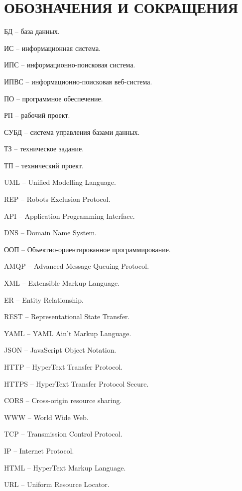 \section*{ОБОЗНАЧЕНИЯ И СОКРАЩЕНИЯ}

БД -- база данных.

ИС -- информационная система.

ИПС -- информационно-поисковая система.

ИПВС -- информационно-поисковая веб-система.

ПО -- программное обеспечение.

РП -- рабочий проект.

СУБД -- система управления базами данных.

ТЗ -- техническое задание.

ТП -- технический проект.

UML -- Unified Modelling Language.

REP -- Robots Exclusion Protocol.

API -- Application Programming Interface.

DNS -- Domain Name System.

ООП -- Объектно-ориентированное программирование.

AMQP -- Advanced Message Queuing Protocol.

XML -- Extensible Markup Language.

ER -- Entity Relationship.

REST -- Representational State Transfer.

YAML -- YAML Ain't Markup Language.

JSON -- JavaScript Object Notation.

HTTP -- HyperText Transfer Protocol.

HTTPS -- HyperText Transfer Protocol Secure.

CORS -- Cross-origin resource sharing.

WWW -- World Wide Web.

TCP -- Transmission Control Protocol.

IP -- Internet Protocol.

HTML -- HyperText Markup Language.

URL -- Uniform Resource Locator.